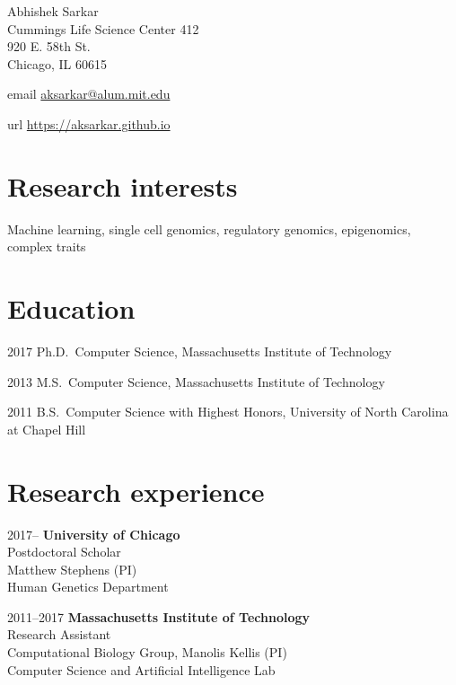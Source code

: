 \documentclass{article}
\begin{document}
{\LARGE Abhishek Sarkar\vspace{1em}}\\
Cummings Life Science Center 412\\
920 E. 58th St.\\
Chicago, IL 60615\vspace{1em}

\begin{hdesc}
\item[email] \url{aksarkar@alum.mit.edu}
\item[url] \url{https://aksarkar.github.io}
\end{hdesc}

\section*{Research interests}
Machine learning, single cell genomics, regulatory genomics, epigenomics,
complex traits

\section*{Education}
\begin{hdesc}
\item[2017] Ph.D.\ Computer Science, Massachusetts Institute of Technology
\item[2013] M.S.\ Computer Science, Massachusetts Institute of Technology
\item[2011] B.S.\ Computer Science with Highest Honors, University of North
  Carolina at Chapel Hill
\end{hdesc}

\section*{Research experience}
\begin{hdesc}[itemsep=1em]
\item[2017--] \textbf{University of Chicago}\\
Postdoctoral Scholar\\
Matthew Stephens (PI)\\
Human Genetics Department
\end{hdesc}
\begin{hdesc}[itemsep=1em]
\item[2011--2017] \textbf{Massachusetts Institute of Technology}\\
Research Assistant\\
Computational Biology Group, Manolis Kellis (PI)\\
Computer Science and Artificial Intelligence Lab
\end{hdesc}
\end{document}
